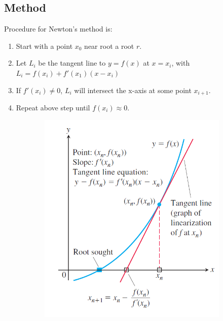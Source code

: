 \documentclass[12pt]{article}
\begin{document}
\subsection{Method}
Procedure for Newton's method is:
\begin{enumerate} 
    \item Start with a point $x_0$ near root a root $r$.
    \item Let $L_i$ be the tangent line to $y = f(x)$ at $x = x_i$, with $L_i = f(x_i) + f'(x_1)(x - x_i)$
    \item If $f'(x_i) \neq 0$, $L_i$ will intersect the x-axis at some point $x_{i + 1}$.
    \item Repeat above step until $f(x_i) \approx 0$.
\end{enumerate}
\begin{figure}[h!]
    \centering
    \begin{subfigure}{0.35\linewidth}
        \centering
        \includegraphics[width = 1\linewidth]{Images/newton's method 1.png}
    \end{subfigure}
    \begin{subfigure}{0.3\linewidth}
        \centering

\end{subfigure}
\end{figure}
\end{document}
